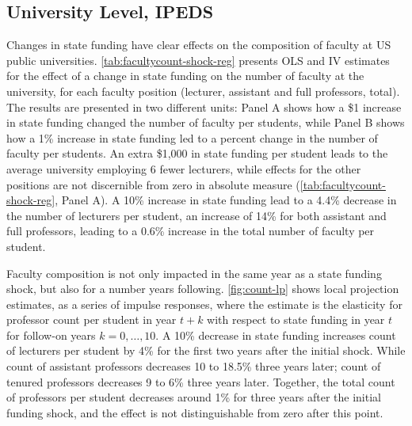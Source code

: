 \subsection{University Level, IPEDS}
Changes in state funding have clear effects on the composition of faculty at US public universities.
\autoref{tab:facultycount-shock-reg} presents OLS and IV estimates for the effect of a change in state funding on the number of faculty at the university, for each faculty position (lecturer, assistant and full professors, total).
The results are presented in two different units: Panel A shows how a \$1 increase in state funding changed the number of faculty per students, while Panel B shows how a 1\% increase in state funding led to a percent change in the number of faculty per students.
An extra \$1,000 in state funding per student leads to the average university employing 6 fewer lecturers, while effects for the other positions are not discernible from zero in absolute measure (\autoref{tab:facultycount-shock-reg}, Panel A).
A 10\% increase in state funding lead to a 4.4\% decrease in the number of lecturers per student, an increase of 14\% for both assistant and full professors, leading to a 0.6\% increase in the total number of faculty per student.


Faculty composition is not only impacted in the same year as a state funding shock, but also for a number years following.
\autoref{fig:count-lp} shows local projection estimates, as a series of impulse responses, where the estimate is the elasticity for professor count per student in year $t+k$ with respect to state funding in year $t$ for follow-on years $k = 0, \hdots, 10$.
A 10\% decrease in state funding increases count of lecturers per student by 4\% for the first two years after the initial shock.
While count of assistant professors decreases 10 to 18.5\% three years later;
count of tenured professors decreases 9 to 6\% three years later.
Together, the total count of professors per student decreases around 1\% for three years after the initial funding shock, and the effect is not distinguishable from zero after this point.

